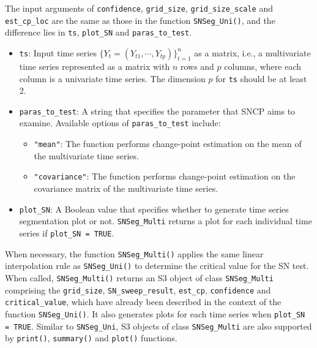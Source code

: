 {The input arguments of   \texttt{confidence}, \texttt{grid\_size}, \texttt{grid\_size\_scale} and \texttt{est\_cp\_loc} are the same as those in the function \texttt{SNSeg\_Uni()}, and the difference lies in \texttt{ts}, \texttt{plot\_SN} and \texttt{paras\_to\_test}.}
\begin{itemize}
	\item \texttt{ts}: Input time series $\{Y_t=(Y_{t1},\cdots,Y_{tp})\}_{t=1}^n$ as a matrix, i.e., a multivariate time series represented as a matrix with $n$ rows and $p$ columns, where each column is a univariate time series. The dimension $p$ for \texttt{ts} should be at least 2.
	\item \texttt{paras\_to\_test}: A string that specifies the parameter that SNCP aims to examine. Available options of \texttt{paras\_to\_test} include:
	\begin{itemize}
		\item \texttt{"mean"}: The function performs change-point estimation on the mean of the multivariate time series.
		\item \texttt{"covariance"}: The function performs change-point estimation on the covariance matrix of the multivariate time series.   
	\end{itemize}
        \item {\texttt{plot\_SN}: A Boolean value that specifies whether to generate time series segmentation plot or not. \texttt{SNSeg\_Multi} returns a plot for each individual time series if \texttt{plot\_SN = TRUE}. }
\end{itemize}

When necessary, the function \texttt{SNSeg\_Multi()} applies the same linear interpolation rule as \texttt{SNSeg\_Uni()} to determine the critical value for the SN test. When called, \texttt{SNSeg\_Multi()} returns {an S3 object of class \texttt{SNSeg\_Multi}} comprising the \texttt{grid\_size}, \texttt{SN\_sweep\_result}, \texttt{est\_cp}, \texttt{confidence} and \texttt{critical\_value}, which have already been described in the context of the function \texttt{SNSeg\_Uni()}. It also generates plots for each time series when \texttt{plot\_SN = TRUE}.
{ Similar to \texttt{SNSeg\_Uni},  S3 objects of class \texttt{SNSeg\_Multi} are also supported by \texttt{print()},  \texttt{summary()} and \texttt{plot()} functions. }




